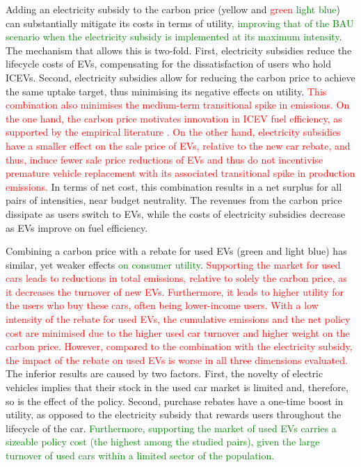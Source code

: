 \documentclass[12pt]{article}
\begin{document}
    Adding an electricity subsidy to the carbon price (yellow and \textcolor{red}{green} \textcolor{green}{light blue}) can substantially mitigate its costs in terms of utility\textcolor{green}{, improving that of the BAU scenario when the electricity subsidy is implemented at its maximum intensity}. The mechanism that allows this is two-fold. First, electricity subsidies reduce the lifecycle costs of EVs, compensating for the dissatisfaction of users who hold ICEVs. Second, electricity subsidies allow for reducing the carbon price to achieve the same uptake target, thus minimising its negative effects on utility. \textcolor{red}{This combination also minimises the medium-term transitional spike in emissions. On the one hand, the carbon price motivates innovation in ICEV fuel efficiency, as supported by the empirical literature \citep{Gebhardt2026}. On the other hand, electricity subsidies have a smaller effect on the sale price of EVs, relative to the new car rebate, and thus, induce fewer sale price reductions of EVs and thus do not incentivise premature vehicle replacement with its associated transitional spike in production emissions.} In terms of net cost, this combination results in a net surplus for all pairs of intensities, near budget neutrality. The revenues from the carbon price dissipate as users switch to EVs, while the costs of electricity subsidies decrease as EVs improve on fuel efficiency. 
    	
	Combining a carbon price with a rebate for used EVs (green and light blue) has similar, yet weaker effects \textcolor{green}{on consumer utility}. \textcolor{red}{Supporting the market for used cars leads to reductions in total emissions, relative to solely the carbon price, as it decreases the turnover of new EVs. Furthermore, it leads to higher utility for the users who buy these cars, often being lower-income users. With a low intensity of the rebate for used EVs, the cumulative emissions and the net policy cost are minimised due to the higher used car turnover and higher weight on the carbon price. However, compared to the combination with the electricity subsidy, the impact of the rebate on used EVs is worse in all three dimensions evaluated.} The inferior results are caused by two factors. First, the novelty of electric vehicles implies that their stock in the used car market is limited and, therefore, so is the effect of the policy. Second, purchase rebates have a one-time boost in utility, as opposed to the electricity subsidy that rewards users throughout the lifecycle of the car. \textcolor{green}{Furthermore, supporting the market of used EVs carries a sizeable policy cost (the highest among the studied pairs), given the large turnover of used cars within a limited sector of the population.}
\end{document}
